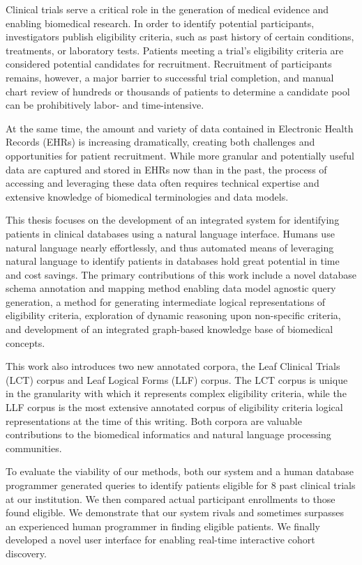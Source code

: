 \documentclass[../main.tex]{subfiles}
\begin{document}
Clinical trials serve a critical role in the generation of medical evidence and enabling biomedical research. In order to identify potential participants, investigators publish eligibility criteria, such as past history of certain conditions, treatments, or laboratory tests. Patients meeting a trial's eligibility criteria are considered potential candidates for recruitment. Recruitment of participants remains, however, a major barrier to successful trial completion, and manual chart review of hundreds or thousands of patients to determine a candidate pool can be prohibitively labor- and time-intensive. 

At the same time, the amount and variety of data contained in Electronic Health Records (EHRs) is increasing dramatically, creating both challenges and opportunities for patient recruitment. While more granular and potentially useful data are captured and stored in EHRs now than in the past, the process of accessing and leveraging these data often requires technical expertise and extensive knowledge of biomedical terminologies and data models.

This thesis focuses on the development of an integrated system for identifying patients in clinical databases using a natural language interface. Humans use natural language nearly effortlessly, and thus automated means of leveraging natural language to identify patients in databases hold great potential in time and cost savings. The primary contributions of this work include a novel database schema annotation and mapping method enabling data model agnostic query generation, a method for generating intermediate logical representations of eligibility criteria, exploration of dynamic reasoning upon non-specific criteria, and development of an integrated graph-based knowledge base of biomedical concepts.

This work also introduces two new annotated corpora, the Leaf Clinical Trials (LCT) corpus and Leaf Logical Forms (LLF) corpus. The LCT corpus is unique in the granularity with which it represents complex eligibility criteria, while the LLF corpus is the most extensive annotated corpus of eligibility criteria logical representations at the time of this writing. Both corpora are valuable contributions to the biomedical informatics and natural language processing communities.

To evaluate the viability of our methods, both our system and a human database programmer generated queries to identify patients eligible for 8 past clinical trials at our institution. We then compared actual participant enrollments to those found eligible. We demonstrate that our system rivals and sometimes surpasses an experienced human programmer in finding eligible patients. We finally developed a novel user interface for enabling real-time interactive cohort discovery.
\end{document}
